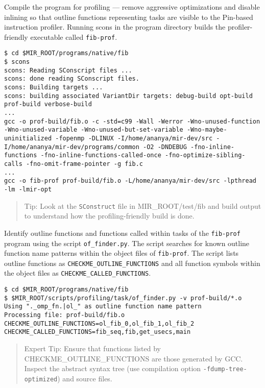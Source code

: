 \documentclass[11pt,a4paper]{article}
\begin{document}
Compile the program for profiling ---  remove aggressive optimizations and disable inlining so that outline functions representing tasks are visible to the Pin-based instruction profiler. Running scons in the program directory builds the profiler-friendly executable called \texttt{fib-prof}.  

\begin{lstlisting}[style=MyInputStyle]
$ cd $MIR_ROOT/programs/native/fib
$ scons 
scons: Reading SConscript files ...
scons: done reading SConscript files.
scons: Building targets ...
scons: building associated VariantDir targets: debug-build opt-build prof-build verbose-build
...
gcc -o prof-build/fib.o -c -std=c99 -Wall -Werror -Wno-unused-function -Wno-unused-variable -Wno-unused-but-set-variable -Wno-maybe-uninitialized -fopenmp -DLINUX -I/home/ananya/mir-dev/src -I/home/ananya/mir-dev/programs/common -O2 -DNDEBUG -fno-inline-functions -fno-inline-functions-called-once -fno-optimize-sibling-calls -fno-omit-frame-pointer -g fib.c
...
gcc -o fib-prof prof-build/fib.o -L/home/ananya/mir-dev/src -lpthread -lm -lmir-opt
\end{lstlisting}
    
\begin{framed}
\begin{quote}
Tip: Look at the \texttt{SConstruct} file in MIR\_ROOT/test/fib and build output to understand how the profiling-friendly build is done.
\end{quote}
\end{framed}

Identify outline functions and functions called within tasks of the \texttt{fib-prof} program using the script \texttt{of\_finder.py}. The script searches for known outline function name patterns within the object files of \texttt{fib-prof}. The script lists outline functions as \texttt{CHECKME\_OUTLINE\_FUNCTIONS} and all function symbols within the object files as \texttt{CHECKME\_CALLED\_FUNCTIONS}.

\begin{lstlisting}[style=MyInputStyle]
$ cd $MIR_ROOT/programs/native/fib
$ $MIR_ROOT/scripts/profiling/task/of_finder.py -v prof-build/*.o
Using "._omp_fn.|ol_" as outline function name pattern
Processing file: prof-build/fib.o
CHECKME_OUTLINE_FUNCTIONS=ol_fib_0,ol_fib_1,ol_fib_2
CHECKME_CALLED_FUNCTIONS=fib_seq,fib,get_usecs,main
\end{lstlisting}

\begin{framed}
\begin{quote}
Expert Tip: Ensure that functions listed by CHECKME\_OUTLINE\_FUNCTIONS are those generated by GCC. Inspect the abstract syntax tree (use compilation option \texttt{-fdump-tree-optimized}) and source files.
\end{quote}
\end{framed}
\end{document}
